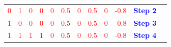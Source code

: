 \documentclass{book}
\begin{document}
\begin{center}
\begin{tabular}{|c|c|c|c|c|c|c|c|c|c|c|c }
        \textcolor{red}{0} & \textcolor{red}{1} & \textcolor{red}{0} & \textcolor{red}{0} & \textcolor{red}{0} & \textcolor{red}{0.5} & \textcolor{red}{0} & \textcolor{red}{0.5} & \textcolor{red}{0} & \textcolor{red}{-0.8} & \textcolor{blue}{\textbf{Step 2}} \\
        \cline{1-10}
        \textcolor{red}{1} & \textcolor{red}{0} & \textcolor{red}{0} & \textcolor{red}{0} & \textcolor{red}{0} & \textcolor{red}{0.5} & \textcolor{red}{0} & \textcolor{red}{0.5} & \textcolor{red}{0} & \textcolor{red}{-0.8} & \textcolor{blue}{\textbf{Step 3}} \\
        \cline{1-10}
        \textcolor{red}{1} & \textcolor{red}{1} & \textcolor{red}{1} & \textcolor{red}{1} & \textcolor{red}{0} & \textcolor{red}{0.5} & \textcolor{red}{0} & \textcolor{red}{0.5} & \textcolor{red}{0} & \textcolor{red}{-0.8} & \textcolor{blue}{\textbf{Step 4}}\\
        \cline{1-10}
    \end{tabular}
\end{center}
\vspace{1cm}
\\
\end{document}
